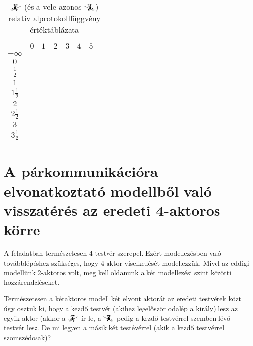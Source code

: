 \documentclass{article}
\newcommand{\blk}{\cellcolor{darkgray}}
\newcommand{\red}{\cellcolor{red!33}}
\newcommand{\grn}{\cellcolor{green!33}}
\newcommand{\nothing}{\text{\raisebox{0.4em}{\rotatebox{180}{$\curvearrowleft$}}}}%
\newcommand{\just}[1]{\boxed{#1}}%
\newcommand{\incl}{\mathbf{incl}}
\newcommand{\excl}{\mathbf{excl}}
\newcommand{\mainfunA}[3]{\mathwitch_{#2}^{#1}#3}
\newcommand{\mainfunB}[3]{\reversemathwitch_{#2}^{#1}#3}
\newcommand{\currymainfunA}{\mathwitch}
\newcommand{\currymainfunB}{\reversemathwitch}
\begin{document}
	\begin{table}[H]
		\caption*{$\currymainfunA$ (és a vele azonos $\currymainfunB$) relatív alprotokollfüggvény értéktáblázata}
		\centering
		\begin{tabular}{c||c|c|c|c|c|c|c|}
				&	$0$		&	$1$		&	$2$		&	$3$		&	$4$		&	$5$		\\\hline\hline
		$-\infty$	&	\nothing	&	\nothing	&	\nothing	&	\nothing	&	\nothing	&	\nothing	\\\hline
			$0$	&	\nothing	&	\nothing	&	\nothing	&	\nothing	&	\nothing	&	\grn\just\incl	\\\hline
		$\frac12$	&	\red\just\excl	&	\nothing	&	\nothing	&	\nothing	&	\nothing	&	\grn\just\incl	\\\hline
			$1$	&	\red\just\excl	&	\nothing	&	\nothing	&	\nothing	&	\grn\just\incl	&	\blk		\\\hline
		$1\frac12$	&	\blk		&	\red\just\excl	&	\nothing	&	\nothing	&	\grn\just\incl	&	\blk		\\\hline
			$2$	&	\blk		&	\red\just\excl	&	\nothing	&	\grn\just\incl	&	\blk		&	\blk		\\\hline
		$2\frac12$	&	\blk		&	\blk		&	\red\just\excl	&	\grn\just\incl	&	\blk		&	\blk		\\\hline
			$3$	&	\blk		&	\blk		&	\blk		&	\blk		&	\blk		&	\blk		\\\hline
		$3\frac12$	&	\blk		&	\blk		&	\blk		&	\blk		&	\blk		&	\blk		\\\hline
		\end{tabular}
	\end{table}

	\section{A párkommunikációra elvonatkoztató modellből való visszatérés az eredeti 4-aktoros körre}

	A feladatban természetesen 4 testvér szerepel. Ezért modellezésben való továbblépéshez szükséges, hogy 4 aktor viselkedését modellezzük.
	Mivel az eddigi modellünk 2-aktoros volt, meg kell oldanunk a két modellezési szint közötti hozzárendeléseket.

	Természetesen a kétaktoros modell két elvont aktorát az eredeti testvérek közt úgy osztuk ki, hogy a kezdő testvér (akihez legelőször odalép a király) lesz az egyik aktor (akkor a $\mainfunA{}{}{}$ ír le, a $\mainfunB{}{}{}$ pedig a kezdő testvérrel szemben lévő testvér lesz. De mi legyen a másik két testévérrel (akik a kezdő testvérrel szomszédosak)?
\end{document}
